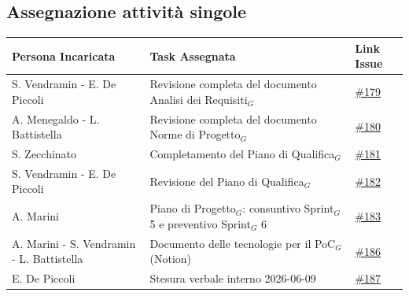 \documentclass[a4paper, 10pt, colorlinks=true, linkcolor=black, urlcolor=blue, citecolor=blue, hidelinks]{article}
\newcommand{\issue}[1]{\href{https://github.com/thebitless-group-swe/thebitless.github.io/issues/#1}{\##1}}
\begin{document}
\subsection{Assegnazione attività singole}
\begin{center}
    \renewcommand{\arraystretch}{1.4}
        \begin{tabular}{|p{4.2cm}|p{6.2cm}|p{2.2cm}|}
        \hline
        \textbf{Persona Incaricata} & \textbf{Task Assegnata} & \centering\textbf{Link Issue} \tabularnewline
        \hline
        S. Vendramin - E. De Piccoli & Revisione completa del documento Analisi dei Requisiti$_G$ & \issue{179} \\
        \hline
        A. Menegaldo - L. Battistella & Revisione completa del documento Norme di Progetto$_G$ & \issue{180} \\
        \hline
        S. Zecchinato & Completamento del Piano di Qualifica$_G$ & \issue{181} \\
        \hline
        S. Vendramin - E. De Piccoli & Revisione del Piano di Qualifica$_G$ & \issue{182} \\
        \hline
        A. Marini & Piano di Progetto$_G$: consuntivo Sprint$_G$ 5 e preventivo Sprint$_G$ 6 & \issue{183} \\
        \hline
        A. Marini - S. Vendramin - L. Battistella & Documento delle tecnologie per il PoC$_G$ (Notion) & \issue{186} \\
        \hline
        E. De Piccoli & Stesura verbale interno 2026-06-09 & \issue{187} \\
        \hline
    \end{tabular}
\end{center}

\appendix
\end{document}
